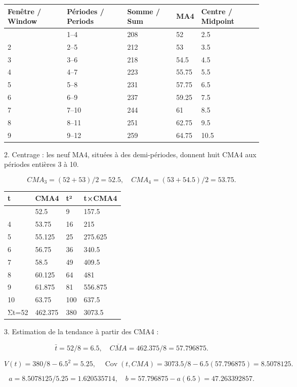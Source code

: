 \documentclass[11pt,a4paper]{article}
\begin{document}
\begin{longtable}[]{@{}lllll@{}}
\toprule\noalign{}
Fenêtre / Window & Périodes / Periods & Somme / Sum & MA4 & Centre / Midpoint \\
\midrule\noalign{}
\endhead
\bottomrule\noalign{}
\endlastfoot
1 & 1--4 & 208 & 52 & 2.5 \\
2 & 2--5 & 212 & 53 & 3.5 \\
3 & 3--6 & 218 & 54.5 & 4.5 \\
4 & 4--7 & 223 & 55.75 & 5.5 \\
5 & 5--8 & 231 & 57.75 & 6.5 \\
6 & 6--9 & 237 & 59.25 & 7.5 \\
7 & 7--10 & 244 & 61 & 8.5 \\
8 & 8--11 & 251 & 62.75 & 9.5 \\
9 & 9--12 & 259 & 64.75 & 10.5 \\
\end{longtable}

2. Centrage : les neuf MA4, situées à des demi-périodes, donnent huit CMA4 aux périodes entières 3 à 10.

\[CMA_3=(52+53)/2=52.5,\quad CMA_4=(53+54.5)/2=53.75.\]

\begin{longtable}[]{@{}llll@{}}
\toprule\noalign{}
t & CMA4 & t² & t×CMA4 \\
\midrule\noalign{}
\endhead
\bottomrule\noalign{}
\endlastfoot
3 & 52.5 & 9 & 157.5 \\
4 & 53.75 & 16 & 215 \\
5 & 55.125 & 25 & 275.625 \\
6 & 56.75 & 36 & 340.5 \\
7 & 58.5 & 49 & 409.5 \\
8 & 60.125 & 64 & 481 \\
9 & 61.875 & 81 & 556.875 \\
10 & 63.75 & 100 & 637.5 \\
Σt=52 & 462.375 & 380 & 3073.5 \\
\end{longtable}

3. Estimation de la tendance à partir des CMA4 :

\[\bar t=52/8=6.5,\quad\overline{CMA}=462.375/8=57.796875.\]

\[V(t)=380/8-6.5^2=5.25,\quad\operatorname{Cov}(t,CMA)=3073.5/8-6.5(57.796875)=8.5078125.\]

\[a=8.5078125/5.25=1.620535714,\quad b=57.796875-a(6.5)=47.263392857.\]
\end{document}
